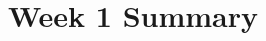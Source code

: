 \documentclass[letterpaper, 10pt, titlepage]{article}
\begin{document}
        \center
        \title{Week 1 Summary}
        \endcenter
\end{document}
